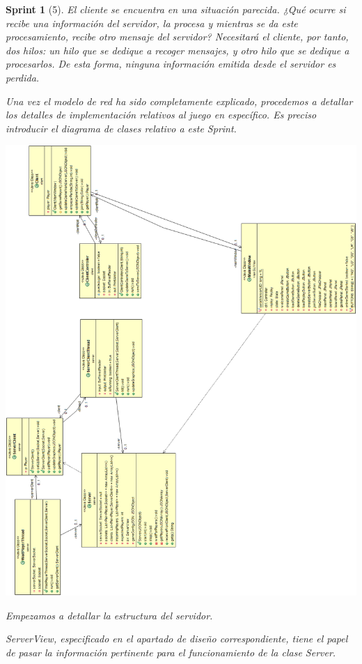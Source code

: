 \documentclass{article}
\theoremstyle{break}
\newtheorem*{sprint}{Sprint}
\begin{document}
\begin{sprint}[5]
El cliente se encuentra en una situación parecida. ¿Qué ocurre si recibe una información del servidor, la procesa y mientras se da este procesamiento, recibe otro mensaje del servidor? Necesitará el cliente, por tanto, dos hilos: un hilo que se dedique a recoger mensajes, y otro hilo que se dedique a procesarlos. De esta forma, ninguna información emitida desde el servidor es perdida.

Una vez el modelo de red ha sido completamente explicado, procedemos a detallar los detalles de implementación relativos al juego en específico. Es preciso introducir el diagrama de clases relativo a este Sprint.

\begin{center}
\includegraphics[scale=0.45]{UMLClasesRedSprint5.png} 
\end{center}

Empezamos a detallar la estructura del servidor.

ServerView, especificado en el apartado de diseño correspondiente, tiene el papel de pasar la información pertinente para el funcionamiento de la clase Server.


\end{sprint}
\end{document}

